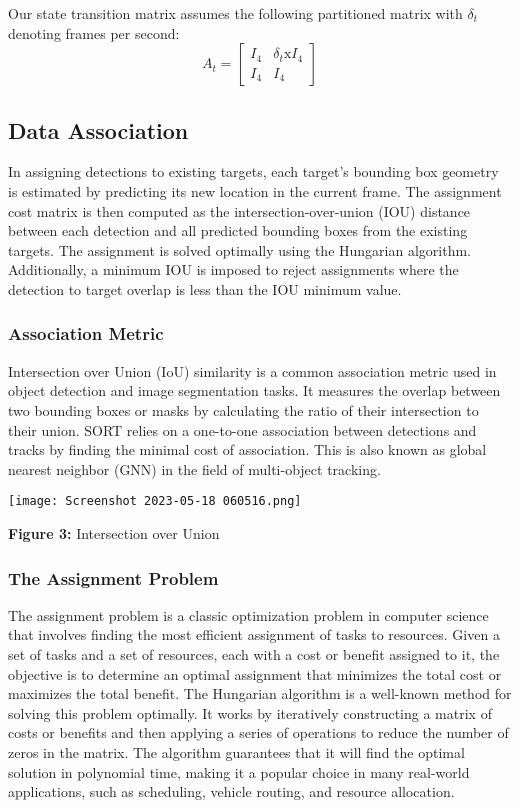 \documentclass[11pt]{article}
\begin{document}
	Our state transition matrix assumes the following partitioned matrix with $\delta_t$ denoting frames per second:
	$$A_t = \begin{bmatrix}
	I_4 & \delta_t \textrm{x} I_4\\
	I_4 & I_4
	\end{bmatrix}$$
	\subsection{Data Association}
	In assigning detections to existing targets, each target’s bounding box geometry is estimated by predicting its new location in the current frame. The assignment cost matrix is then computed as the intersection-over-union (IOU) distance between each detection and all predicted bounding boxes from the existing targets. The assignment is solved optimally
using the Hungarian algorithm. Additionally, a minimum
IOU is imposed to reject assignments where the detection to target overlap is less than the IOU minimum value.
		\subsubsection{Association Metric}
		Intersection over Union (IoU) similarity is a common association metric used in object detection and image segmentation tasks. It measures the overlap between two bounding boxes or masks by calculating the ratio of their intersection to their union. SORT relies on a one-to-one association between detections and tracks by finding the minimal cost of association. This is also known as global nearest neighbor (GNN) in the field of multi-object tracking.
		\begin{center}
\texttt{[image: Screenshot 2023-05-18 060516.png]}

\textbf{Figure 3:} Intersection over Union 
\end{center}
		
		\subsubsection{The Assignment Problem}
		The assignment problem is a classic optimization problem in computer science that involves finding the most efficient assignment of tasks to resources. Given a set of tasks and a set of resources, each with a cost or benefit assigned to it, the objective is to determine an optimal assignment that minimizes the total cost or maximizes the total benefit. The Hungarian algorithm is a well-known method for solving this problem optimally. It works by iteratively constructing a matrix of costs or benefits and then applying a series of operations to reduce the number of zeros in the matrix. The algorithm guarantees that it will find the optimal solution in polynomial time, making it a popular choice in many real-world applications, such as scheduling, vehicle routing, and resource allocation.
		
\end{document}
